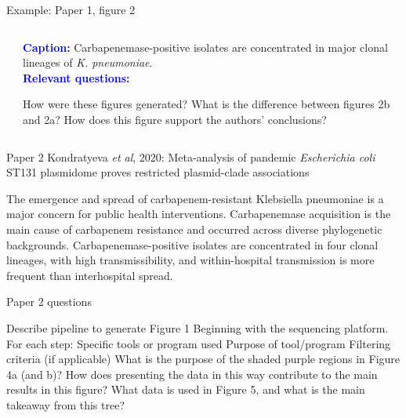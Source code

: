 \documentclass{beamer}
\renewcommand{\c}[1]{\begin{center}#1\end{center}}
\newcommand{\blu}[1]{\textcolor{blue}{\textbf{#1}}}
\newcommand{\gr}[2][.95]{\c{\texttt{[image: \#2]}}}
\begin{document}
\begin{frame}{Example: Paper 1, figure 2}
    \begin{columns}
        \begin{column}{0.4\textwidth}
            \fbox{\gr{final_assignment_figs/david19_fig2.png}}
        \end{column}
        \begin{column}{0.6\textwidth}
            \blu{Caption:} Carbapenemase-positive isolates are concentrated in major clonal lineages of \textit{K. pneumoniae}.\\
            \bigskip
            \blu{Relevant questions:}
            \begin{outline}
                \1 How were these figures generated?
                \1 What is the difference between figures 2b and 2a?
                \1 How does this figure support the authors' conclusions?
            \end{outline}
        \end{column}
    \end{columns}
\end{frame}

\begin{frame}{Paper 2}
    Kondratyeva \textit{et al}, 2020: Meta-analysis of pandemic \textit{Escherichia coli} ST131 plasmidome proves restricted plasmid-clade associations
    \begin{outline}
        \1 The emergence and spread of carbapenem-resistant Klebsiella pneumoniae is a major concern for public health interventions.
        \1 Carbapenemase acquisition is the main cause of carbapenem resistance and occurred across diverse phylogenetic backgrounds.
        \1 Carbapenemase-positive isolates are concentrated in four clonal lineages, with high transmissibility, and within-hospital transmission is more frequent than interhospital spread. 
    \end{outline}
\end{frame}

\begin{frame}{Paper 2 questions}
    \begin{outline}
        \1 Describe pipeline to generate Figure 1
            \2 Beginning with the sequencing platform.
            \2 For each step:
                \3 Specific tools or program used
                \3 Purpose of tool/program
                \3 Filtering criteria (if applicable)
        \1 What is the purpose of the shaded purple regions in Figure 4a (and b)?
            \2 How does presenting the data in this way contribute to the main results in this figure?
        \1 What data is used in Figure 5, and what is the main takeaway from this tree?
    \end{outline}
\end{frame}
\end{document}
